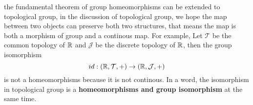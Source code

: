 \documentclass[12pt,a4paper]{article}
\begin{document}
the fundamental theorem of group homeomorphisms can be extended to topological group, in the discussion of topological group, we hope the map between two objects can preserve both two structures, that means the map is both a morphism of group and a continous map. For example, Let \(\mathcal{T}\) be the common topology of \(\mathbb{R}\) and \(\mathcal{J}\) be the discrete topology of \(\mathbb{R}\), then the group isomorphism 
\[ id: (\mathbb{R},\mathcal{T},+) \to (\mathbb{R},\mathcal{J},+) \]
is not a homeomorphisms because it is not continous. In a word, the isomorphism in topological group is a \textbf{homeomorphisms and group isomorphism} at the same time.
\end{document}

